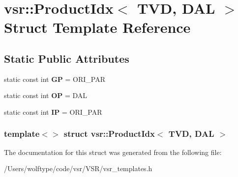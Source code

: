 \hypertarget{structvsr_1_1_product_idx_3_01_t_v_d_00_01_d_a_l_01_4}{\section{vsr\-:\-:Product\-Idx$<$ T\-V\-D, D\-A\-L $>$ Struct Template Reference}
\label{structvsr_1_1_product_idx_3_01_t_v_d_00_01_d_a_l_01_4}
}
\subsection*{Static Public Attributes}
\begin{DoxyCompactItemize}
\item 
\hypertarget{structvsr_1_1_product_idx_3_01_t_v_d_00_01_d_a_l_01_4_af0e84510a996bc2a1d7b7d299f9b1490}{static const int {\bfseries G\-P} = O\-R\-I\-\_\-\-P\-A\-R}\label{structvsr_1_1_product_idx_3_01_t_v_d_00_01_d_a_l_01_4_af0e84510a996bc2a1d7b7d299f9b1490}

\item 
\hypertarget{structvsr_1_1_product_idx_3_01_t_v_d_00_01_d_a_l_01_4_a9338edf3c4353984e1869f21c4dbdd39}{static const int {\bfseries O\-P} = D\-A\-L}\label{structvsr_1_1_product_idx_3_01_t_v_d_00_01_d_a_l_01_4_a9338edf3c4353984e1869f21c4dbdd39}

\item 
\hypertarget{structvsr_1_1_product_idx_3_01_t_v_d_00_01_d_a_l_01_4_a97c412553b10847221047196d828159c}{static const int {\bfseries I\-P} = O\-R\-I\-\_\-\-P\-A\-R}\label{structvsr_1_1_product_idx_3_01_t_v_d_00_01_d_a_l_01_4_a97c412553b10847221047196d828159c}

\end{DoxyCompactItemize}
\subsubsection*{template$<$$>$ struct vsr\-::\-Product\-Idx$<$ T\-V\-D, D\-A\-L $>$}



The documentation for this struct was generated from the following file\-:\begin{DoxyCompactItemize}
\item 
/\-Users/wolftype/code/vsr/\-V\-S\-R/vsr\-\_\-templates.\-h\end{DoxyCompactItemize}
